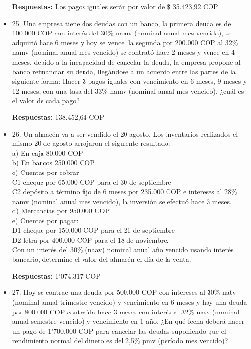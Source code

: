 \begin{itemize}
   \textbf{Respuestas:} Los pagos iguales serán por valor de \$ 35.423,92 COP
       \medskip

 \item 25. Una empresa tiene dos deudas con un banco, la primera deuda es de 100.000 COP con interés del 30\% namv (nominal anual mes vencido), se adquirió hace 6 meses y hoy se vence; la segunda por 200.000 COP al 32\% namv (nominal anual mes vencido) se contrató hace 2 meses y vence en 4 meses, debido a la incapacidad de cancelar la deuda, la empresa propone al banco refinanciar su deuda, llegándose a un acuerdo entre las partes de la siguiente forma: Hacer 3 pagos iguales con vencimiento en 6 meses, 9 meses y 12 meses, con una tasa del 33\% namv (nominal anual mes vencido). ¿cuál es el valor de cada pago?
 
       \textbf{Respuestas:} 138.452,64 COP
       \medskip

 \item 26. Un almacén va a ser vendido el 20 agosto. Los inventarios realizados el mismo 20 de agosto arrojaron el siguiente resultado:\\

       a)   En caja 80.000 COP\\
       b)   En bancos 250.000 COP\\
       c)   Cuentas por cobrar \\
       C1 cheque por 65.000 COP para el 30 de septiembre\\
       C2 depósito a término fijo de 6 meses por 235.000 COP e intereses al 28\% namv (nominal anual mes vencido), la inversión se efectuó hace 3 meses.\\
       d)   Mercancías por 950.000 COP\\
       e)   Cuentas por pagar:\\
       D1 cheque por 150.000 COP para el 21 de septiembre\\
       D2 letra por 400.000 COP para el 18 de noviembre.\\

       Con un interés del 30\% (naav) nominal anual año vencido usando interés bancario, determine el valor del almacén el día de la venta.
       
       \textbf{Respuestas:} 1’074.317 COP
       \medskip

 \item 27. Hoy se contrae una deuda por 500.000 COP con intereses al 30\% natv (nominal anual trimestre vencido) y vencimiento en 6 meses y hay una deuda por 800.000 COP contraída hace 3 meses con interés al 32\% nasv (nominal anual semestre vencido) y vencimiento en 1 año. ¿En qué fecha deberá hacer un pago de 1’700.000 COP para cancelar las deudas suponiendo que el rendimiento normal del dinero es del 2,5\% pmv (período mes vencido)?
 

\end{itemize}
